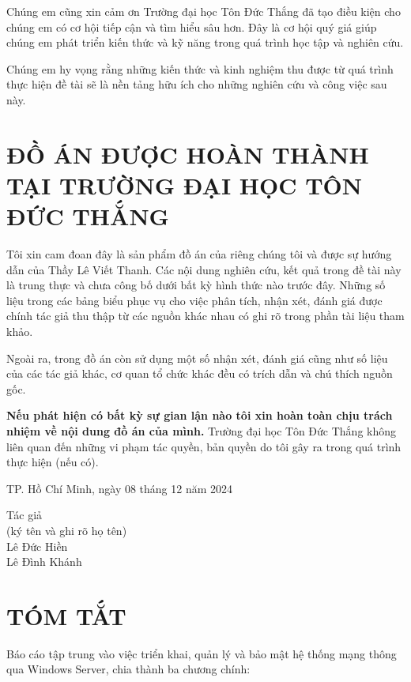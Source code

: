 \documentclass[13pt]{article}
\begin{document}
        Chúng em cũng xin cảm ơn Trường đại học Tôn Đức Thắng đã tạo điều kiện cho chúng em có cơ hội tiếp cận và tìm hiểu sâu hơn. Đây là cơ hội quý giá giúp chúng em phát triển kiến thức và kỹ năng trong quá trình học tập và nghiên cứu.
        
        Chúng em hy vọng rằng những kiến thức và kinh nghiệm thu được từ quá trình thực hiện đề tài sẽ là nền tảng hữu ích cho những nghiên cứu và công việc sau này.

        \newpage
        \section*{\centering \fontsize{20pt}{24pt}\selectfont ĐỒ ÁN ĐƯỢC HOÀN THÀNH TẠI TRƯỜNG ĐẠI HỌC TÔN ĐỨC THẮNG}
        
        Tôi xin cam đoan đây là sản phẩm đồ án của riêng chúng tôi và được sự hướng dẫn của Thầy Lê Viết Thanh. Các nội dung nghiên cứu, kết quả trong đề tài này là trung thực và chưa công bố dưới bất kỳ hình thức nào trước đây. Những số liệu trong các bảng biểu phục vụ cho việc phân tích, nhận xét, đánh giá được chính tác giả thu thập từ các nguồn khác nhau có ghi rõ trong phần tài liệu tham khảo.
        
        Ngoài ra, trong đồ án còn sử dụng một số nhận xét, đánh giá cũng như số liệu của các tác giả khác, cơ quan tổ chức khác đều có trích dẫn và chú thích nguồn gốc.
        
        \textbf{Nếu phát hiện có bất kỳ sự gian lận nào tôi xin hoàn toàn chịu trách nhiệm về nội dung đồ án của mình.} Trường đại học Tôn Đức Thắng không liên quan đến những vi phạm tác quyền, bản quyền do tôi gây ra trong quá trình thực hiện (nếu có).
        
        \begin{flushright}
        TP. Hồ Chí Minh, ngày 08 tháng 12 năm 2024\\
        \end{flushright}
        \hspace*{10cm}Tác giả\\
        \hspace*{8cm}(ký tên và ghi rõ họ tên)\\
        \hspace*{9.5cm}Lê Đức Hiền\\
        \hspace*{9.3cm}Lê Đình Khánh

        \newpage
        \section*{\centering \fontsize{16}{20}\selectfont TÓM TẮT}
        Báo cáo tập trung vào việc triển khai, quản lý và bảo mật hệ thống mạng thông qua Windows Server, chia thành ba chương chính:
\end{document}
